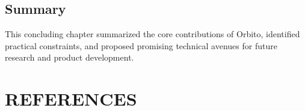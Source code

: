 \documentclass[12pt,a4paper]{article}
\begin{document}
\subsection{Summary}
This concluding chapter summarized the core contributions of Orbito, identified practical constraints, and proposed promising technical avenues for future research and product development.

\newpage

\section{REFERENCES}

\begingroup
\renewcommand{\section}[2]{}%
\end{document}
